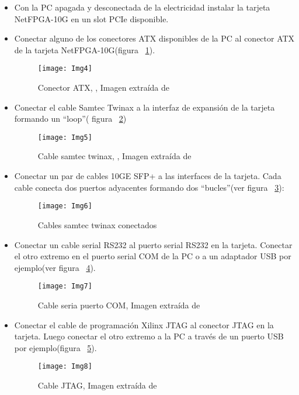 \begin{itemize}
\item Con la PC apagada y desconectada de la electricidad instalar la tarjeta NetFPGA-10G en un slot PCIe disponible.

\item Conectar alguno de los conectores ATX disponibles de la PC al conector ATX de la tarjeta NetFPGA-10G(figura ~\ref{fig:Img4}).

\begin{figure}[htbp!] 
\centering    
\texttt{[image: Img4]}
\caption[Conector ATX]{Conector ATX, , Imagen extra\'ida de \citep{NetFPGA6}}
\label{fig:Img4}
\end{figure}

\item Conectar el cable Samtec Twinax a la interfaz de expansión de la tarjeta formando un “loop”( figura ~\ref{fig:Img5})

\newpage
\begin{figure}[htbp!] 
\centering    
\texttt{[image: Img5]}
\caption[Cable samtec twinax]{Cable samtec twinax, , Imagen extra\'ida de \citep{NetFPGA6}}
\label{fig:Img5}
\end{figure}

\item Conectar un par de cables 10GE SFP+ a las interfaces de la tarjeta. Cada cable conecta dos puertos adyacentes formando dos “bucles”(ver figura ~\ref{fig:Img6}):

\begin{figure}[htbp!] 
\centering    
\texttt{[image: Img6]}
\caption[Cables samtec twinax conectados]{Cables samtec twinax conectados}
\label{fig:Img6}
\end{figure}

\item Conectar un cable serial RS232 al puerto serial RS232 en la tarjeta. Conectar el otro extremo en el puerto serial COM de la PC o a un adaptador USB por ejemplo(ver figura ~\ref{fig:Img7}).

\begin{figure}[htbp!] 
\centering    
\texttt{[image: Img7]}
\caption[Cable serial puerto COM]{Cable seria puerto COM, Imagen extra\'ida de \citep{NetFPGA6}}
\label{fig:Img7}
\end{figure}

\item Conectar el cable de programación Xilinx JTAG al conector JTAG en la tarjeta. Luego conectar el otro extremo a la PC a través de un puerto USB por ejemplo(figura ~\ref{fig:Img8}).

\newpage
\begin{figure}[htbp!] 
\centering    
\texttt{[image: Img8]}
\caption[Cable JTAG]{Cable JTAG, Imagen extra\'ida de \citep{NetFPGA6}}
\label{fig:Img8}
\end{figure}

\end{itemize}

